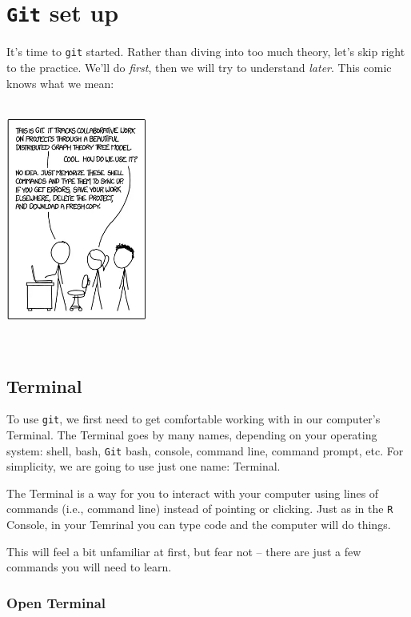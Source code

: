 \documentclass[
]{book}
\begin{document}
\hypertarget{git-set-up}{%
\section*{\texorpdfstring{\texttt{Git} set up}{Git set up}}\label{git-set-up}}

It's time to \texttt{git} started. Rather than diving into too much theory, let's skip right to the practice. We'll do \emph{first}, then we will try to understand \emph{later}. This comic knows what we mean:

~\\

\includegraphics[width=0.35\textwidth,height=\textheight]{img/git.png}

~

\hypertarget{terminal}{%
\subsection*{Terminal}\label{terminal}}

To use \texttt{git}, we first need to get comfortable working with in our computer's Terminal. The Terminal goes by many names, depending on your operating system: shell, bash, \texttt{Git} bash, console, command line, command prompt, etc. For simplicity, we are going to use just one name: Terminal.

The Terminal is a way for you to interact with your computer using lines of commands (i.e., command line) instead of pointing or clicking. Just as in the \texttt{R} Console, in your Temrinal you can type code and the computer will do things.

This will feel a bit unfamiliar at first, but fear not -- there are just a few commands you will need to learn.

\hypertarget{open-terminal}{%
\subsubsection*{Open Terminal}\label{open-terminal}}
\end{document}
